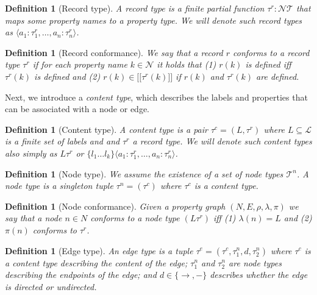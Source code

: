 \documentclass[a4paper]{article}
\makeatletter
\newtheorem{definition}[theorem]{Definition}
\newcommand{\rtype}{\tau^r}
\newcommand{\ctype}{\tau^c}
\newcommand{\ntype}{\tau^n}
\newcommand{\etype}{\tau^e}
\newcommand{\lsem}{\ensuremath{[\![}}
\newcommand{\rsem}{\ensuremath{]\!]}}
\newcommand{\sem}[1]{\ensuremath{\lsem #1 \rsem}}
\newcommand{\pto}{}%
\DeclareRobustCommand{\pto}{\mathrel{\mathpalette\p@to@gets\to}}
\newcommand{\p@to@gets}[2]{%
  \ooalign{\hidewidth$\m@th#1\mapstochar\mkern5mu$\hidewidth\cr$\m@th#1\to$\cr}%
}
\makeatother
\begin{document}
\begin{definition}[Record type]
  A \emph{record type} is a finite partial function $\rtype : \mathcal{N} \pto \mathcal{T}$ that maps some property names to a property type. We will denote such record types as $\langle a_1 : \rtype_1, \ldots, a_n : \rtype_n \rangle$.
\end{definition}

\begin{definition}[Record conformance]
  We say that a record $r$ \emph{conforms} to a record type $\rtype$ if for each property name $k \in \mathcal{N}$ it holds that (1) $r(k)$ is defined iff $\rtype(k)$ is defined and (2) $r(k) \in \sem{\rtype(k)}$ if $r(k)$ and $\rtype(k)$ are defined.
\end{definition}

Next, we introduce a \emph{content type}, which describes the labels and properties that can be associated with a node or edge.

\begin{definition}[Content type]
  A \emph{content type} is a pair $\ctype = (L, \rtype)$ where $L \subseteq \mathcal{L}$ is a finite set of labels and and $\rtype$ a record type. We will denote such content types also simply as $L \rtype$ or $\{ l_1 \ldots l_k \} \langle a_1 : \rtype_1, \ldots, a_n : \rtype_n \rangle$.
\end{definition}

\begin{definition}[Node type]
  We assume the existence of a set of \emph{node types} $\mathcal{T}^n$. A node type is a singleton tuple $\ntype = (\ctype)$ where $\ctype$ is a content type.
\end{definition}

\begin{definition}[Node conformance]
  Given a property graph $(N, E, \rho, \lambda, \pi)$ we say that a node $n \in N$ \emph{conforms} to a node type $(L\rtype)$ iff (1) $\lambda(n) = L$ and (2) $\pi(n)$ conforms to $\rtype$.
\end{definition}

\begin{definition}[Edge type]
  An \emph{edge type} is a tuple $\etype = (\ctype, \ntype_1, d, \ntype_2)$ where $\ctype$ is a content type describing the content of the edge; $\ntype_1$ and $\ntype_2$ are node types describing the endpoints of the edge; and $d \in \{\rightarrow, -\}$ describes whether the edge is directed or undirected.
\end{definition}
  
\end{document}
